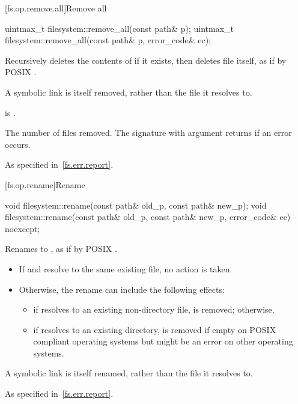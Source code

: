 [fs.op.remove.all]{Remove all}

%
\begin{itemdecl}
uintmax_t filesystem::remove_all(const path& p);
uintmax_t filesystem::remove_all(const path& p, error_code& ec);
\end{itemdecl}

\begin{itemdescr}
\pnum
\effects
Recursively deletes the contents of  if it exists,
  then deletes file  itself, as if by POSIX .
\begin{note}
A symbolic link is itself removed, rather than the file it
  resolves to.
\end{note}

\pnum
\ensures
{} is .

\pnum
\returns
The number of files removed. The signature with argument
   returns  if an error
  occurs.

\pnum
\throws
As specified in~\ref{fs.err.report}.
\end{itemdescr}


[fs.op.rename]{Rename}

%
\begin{itemdecl}
void filesystem::rename(const path& old_p, const path& new_p);
void filesystem::rename(const path& old_p, const path& new_p, error_code& ec) noexcept;
\end{itemdecl}

\begin{itemdescr}
\pnum
\effects
Renames  to , as if by
  POSIX .

\begin{note}
\begin{itemize}
\item If  and  resolve to the same existing file,
   no action is taken.
\item Otherwise, the rename can include the following effects:
\begin{itemize}
\item if  resolves to an existing non-directory file,
     is removed; otherwise,
\item if  resolves to an existing directory,
     is removed if empty on POSIX compliant operating systems
    but might be an error on other operating systems.
\end{itemize}
\end{itemize}
A symbolic link is itself renamed, rather than the file it resolves to.
\end{note}

\pnum
\throws
As specified in~\ref{fs.err.report}.
\end{itemdescr}


